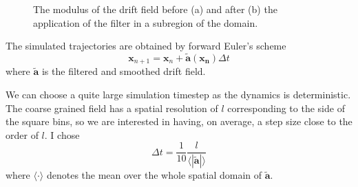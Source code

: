 \documentclass[a4paper]{article}
\begin{document}
\begin{figure}[htbp] \label{fig:filtering}
  \caption{The modulus of the drift field before (a) and after (b) the application of the filter in a subregion of the domain.}
\end{figure}

The simulated trajectories are obtained by forward Euler's scheme
\begin{equation}
\bm{x}_{n+1} = \bm{x}_n + \bm{\tilde{a}}(\bm{x_n})\Delta t
\end{equation}
where $\bm{\tilde{a}}$ is the filtered and smoothed drift field.

We can choose a quite large simulation timestep as the dynamics is deterministic. The coarse grained field has a spatial resolution of $l$ corresponding to the side of the square bins, so we are interested in having, on average, a step size close to the order of $l$. I chose
\begin{equation}
\Delta t = \frac{1}{10} \frac{l}{\langle|\bm{\tilde{a}}|\rangle}
\end{equation}
where $\langle\cdot\rangle$ denotes the mean over the whole spatial domain of $\bm{\tilde{a}}$.
\end{document}
